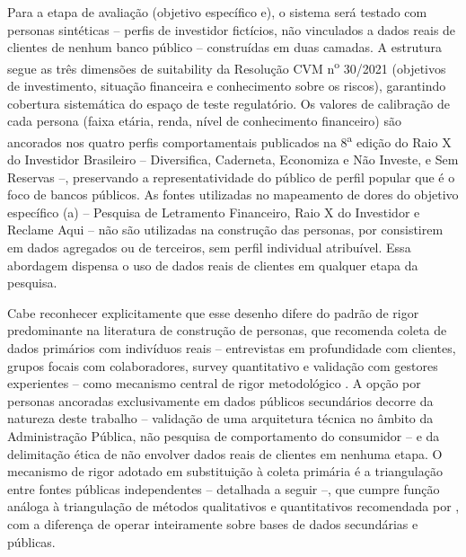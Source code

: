 Para a etapa de avalia\c{c}\~ao (objetivo espec\'ifico e), o sistema ser\'a
testado com personas sint\'eticas -- perfis de investidor fict\'icios,
n\~ao vinculados a dados reais de clientes de nenhum banco p\'ublico -- constru\'idas em duas
camadas. A estrutura segue as tr\^es dimens\~oes de suitability da
Resolu\c{c}\~ao CVM n\textsuperscript{o} 30/2021 (objetivos de
investimento, situa\c{c}\~ao financeira e conhecimento sobre os riscos),
garantindo cobertura sistem\'atica do espa\c{c}o de teste regulat\'orio.
Os valores de calibra\c{c}\~ao de cada persona (faixa et\'aria, renda,
n\'ivel de conhecimento financeiro) s\~ao ancorados nos quatro perfis
comportamentais publicados na 8\textsuperscript{a} edi\c{c}\~ao do Raio X
do Investidor Brasileiro \autocite{anbima2025} -- Diversifica, Caderneta,
Economiza e N\~ao Investe, e Sem Reservas --, preservando a
representatividade do p\'ublico de perfil popular que \'e o foco de bancos p\'ublicos.
As fontes utilizadas no mapeamento de dores do objetivo espec\'ifico (a) --
Pesquisa de Letramento Financeiro, Raio X do Investidor e Reclame Aqui --
n\~ao s\~ao utilizadas na constru\c{c}\~ao das personas, por consistirem
em dados agregados ou de terceiros, sem perfil individual atribu\'ivel.
Essa abordagem dispensa o uso de dados reais de clientes em qualquer
etapa da pesquisa.

Cabe reconhecer explicitamente que esse desenho difere do padr\~ao de
rigor predominante na literatura de constru\c{c}\~ao de personas, que
recomenda coleta de dados prim\'arios com indiv\'iduos reais --
entrevistas em profundidade com clientes, grupos focais com
colaboradores, survey quantitativo e valida\c{c}\~ao com gestores
experientes -- como mecanismo central de rigor metodol\'ogico
\autocite{nogamisenra2025}. A op\c{c}\~ao por personas ancoradas
exclusivamente em dados p\'ublicos secund\'arios decorre da natureza
deste trabalho -- valida\c{c}\~ao de uma arquitetura t\'ecnica no
\^ambito da Administra\c{c}\~ao P\'ublica, n\~ao pesquisa de
comportamento do consumidor -- e da delimita\c{c}\~ao \'etica de n\~ao
envolver dados reais de clientes em nenhuma etapa. O mecanismo de rigor
adotado em substitui\c{c}\~ao \`a coleta prim\'aria \'e a
triangula\c{c}\~ao entre fontes p\'ublicas independentes -- detalhada a
seguir --, que cumpre fun\c{c}\~ao an\'aloga \`a triangula\c{c}\~ao de
m\'etodos qualitativos e quantitativos recomendada por
\textcite{nogamisenra2025}, com a diferen\c{c}a de operar inteiramente
sobre bases de dados secund\'arias e p\'ublicas.

